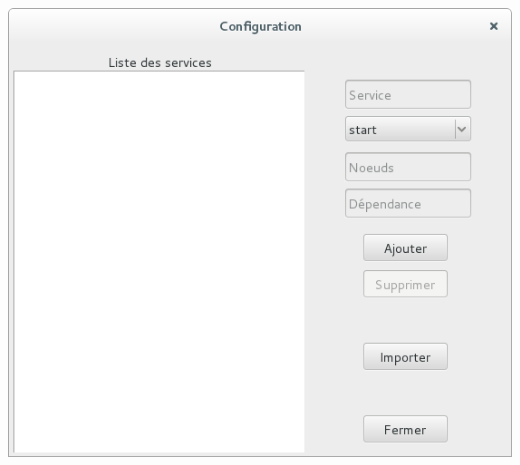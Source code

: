 \documentclass[a4paper,11pt]{article}
\begin{document}
\begin{center}
\includegraphics[scale=0.5]{configuration_IHM_photo.png} 
\end{center}
\end{document}
